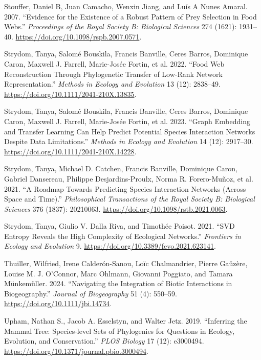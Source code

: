 \documentclass[
  letterpaper,
  DIV=11,
  numbers=noendperiod]{scrartcl}
\newlength{\cslhangindent}
\newenvironment{CSLReferences}[2] %
 {\begin{list}{}{%
  \setlength{\itemindent}{0pt}
  \setlength{\leftmargin}{0pt}
  \setlength{\parsep}{0pt}
  \ifodd #1
   \setlength{\leftmargin}{\cslhangindent}
   \setlength{\itemindent}{-1\cslhangindent}
  \fi
  \setlength{\itemsep}{#2\baselineskip}}}
 {\end{list}}
\begin{document}
\begin{CSLReferences}{1}{0}
Stouffer, Daniel B, Juan Camacho, Wenxin Jiang, and Luís A Nunes Amaral.
2007. {``Evidence for the Existence of a Robust Pattern of Prey
Selection in Food Webs.''} \emph{Proceedings of the Royal Society B:
Biological Sciences} 274 (1621): 1931--40.
\url{https://doi.org/10.1098/rspb.2007.0571}.

Strydom, Tanya, Salomé Bouskila, Francis Banville, Ceres Barros,
Dominique Caron, Maxwell J. Farrell, Marie-Josée Fortin, et al. 2022.
{``Food Web Reconstruction Through Phylogenetic Transfer of Low-Rank
Network Representation.''} \emph{Methods in Ecology and Evolution} 13
(12): 2838--49. \url{https://doi.org/10.1111/2041-210X.13835}.

Strydom, Tanya, Salomé Bouskila, Francis Banville, Ceres Barros,
Dominique Caron, Maxwell J. Farrell, Marie-Josée Fortin, et al. 2023.
{``Graph Embedding and Transfer Learning Can Help Predict Potential
Species Interaction Networks Despite Data Limitations.''} \emph{Methods
in Ecology and Evolution} 14 (12): 2917--30.
\url{https://doi.org/10.1111/2041-210X.14228}.

Strydom, Tanya, Michael D. Catchen, Francis Banville, Dominique Caron,
Gabriel Dansereau, Philippe Desjardins-Proulx, Norma R. Forero-Muñoz, et
al. 2021. {``A Roadmap Towards Predicting Species Interaction Networks
(Across Space and Time).''} \emph{Philosophical Transactions of the
Royal Society B: Biological Sciences} 376 (1837): 20210063.
\url{https://doi.org/10.1098/rstb.2021.0063}.

Strydom, Tanya, Giulio V. Dalla Riva, and Timothée Poisot. 2021. {``{SVD
Entropy Reveals} the {High Complexity} of {Ecological Networks}.''}
\emph{Frontiers in Ecology and Evolution} 9.
\url{https://doi.org/10.3389/fevo.2021.623141}.

Thuiller, Wilfried, Irene Calderón-Sanou, Loïc Chalmandrier, Pierre
Gaüzère, Louise M. J. O'Connor, Marc Ohlmann, Giovanni Poggiato, and
Tamara Münkemüller. 2024. {``Navigating the Integration of Biotic
Interactions in Biogeography.''} \emph{Journal of Biogeography} 51 (4):
550--59. \url{https://doi.org/10.1111/jbi.14734}.

Upham, Nathan S., Jacob A. Esselstyn, and Walter Jetz. 2019.
{``Inferring the Mammal Tree: {Species-level} Sets of Phylogenies for
Questions in Ecology, Evolution, and Conservation.''} \emph{PLOS
Biology} 17 (12): e3000494.
\url{https://doi.org/10.1371/journal.pbio.3000494}.


\end{CSLReferences}
\end{document}
